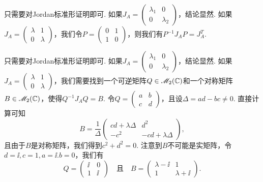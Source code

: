 \begin{solution}
  \begin{inparaenum}[(a)]
    \item 只需要对Jordan标准形证明即可. 如果$J_A=\begin{pmatrix}
          \lambda_1 & 0 \\
          0 & \lambda_2
        \end{pmatrix}$，结论显然. 如果$J_A=\begin{pmatrix}
          \lambda & 1 \\
          0 & \lambda
        \end{pmatrix}$，我们令$P=\begin{pmatrix}
          0 & 1 \\
          1 & 0
        \end{pmatrix}$，则我们有$P^{-1}J_AP=J_A^T$.

    \item 只需要对Jordan标准形证明即可. 如果$J_A=\begin{pmatrix}
          \lambda_1 & 0 \\
          0 & \lambda_2
        \end{pmatrix}$，结论显然. 如果$J_A=\begin{pmatrix}
          \lambda & 1 \\
          0 & \lambda
        \end{pmatrix}$，我们需要找到一个可逆矩阵$Q\in\mathscr M_2(\mathbb C)$和一个对称矩阵$B\in\mathscr M_2(\mathbb C)$，使得$Q^{-1}J_AQ=B$. 令$Q=\begin{pmatrix}
          a & b \\
          c & d
        \end{pmatrix}$，且设$\varDelta=ad-bc\ne0$. 直接计算可知
        \[
          B = \frac1{\varDelta} \begin{pmatrix}
            cd + \lambda\varDelta & d^2 \\
            -c^2 & -cd + \lambda\varDelta
          \end{pmatrix},
        \]
        且由于$B$是对称矩阵，我们得到$c^2+d^2=0$. 注意到$B$不可能是实矩阵，令$d=\ii,c=1,a=\ii.b=0$，我们有
        \[
          Q = \begin{pmatrix}
            \ii & 0 \\
            1 & \ii
          \end{pmatrix}\quad \text{且}\quad
          B = \begin{pmatrix}
            \lambda - \ii & 1 \\
            1 & \lambda + \ii
          \end{pmatrix}.
        \]
  \end{inparaenum}
\end{solution}

